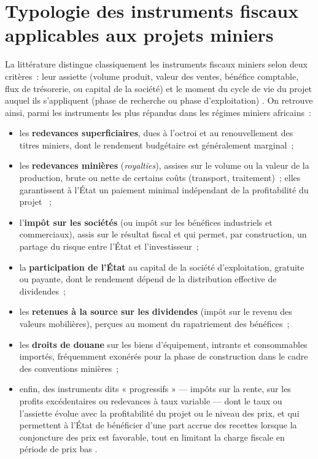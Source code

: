 \section{Typologie des instruments fiscaux applicables aux projets miniers}
\label{sec:typologie}

La littérature distingue classiquement les instruments fiscaux miniers selon deux critères~: leur assiette (volume produit, valeur des ventes, bénéfice comptable, flux de trésorerie, ou capital de la société) et le moment du cycle de vie du projet auquel ils s'appliquent (phase de recherche ou phase d'exploitation) \citep{otto2006royalties}. On retrouve ainsi, parmi les instruments les plus répandus dans les régimes miniers africains~:

\begin{itemize}
  \item les \textbf{redevances superficiaires}, dues à l'octroi et au renouvellement des titres miniers, dont le rendement budgétaire est généralement marginal~;
  \item les \textbf{redevances minières} (\emph{royalties}), assises sur le volume ou la valeur de la production, brute ou nette de certains coûts (transport, traitement)~; elles garantissent à l'État un paiement minimal indépendant de la profitabilité du projet \citep{guj2012royalties}~;
  \item l'\textbf{impôt sur les sociétés} (ou impôt sur les bénéfices industriels et commerciaux), assis sur le résultat fiscal et qui permet, par construction, un partage du risque entre l'État et l'investisseur~;
  \item la \textbf{participation de l'État} au capital de la société d'exploitation, gratuite ou payante, dont le rendement dépend de la distribution effective de dividendes~;
  \item les \textbf{retenues à la source sur les dividendes} (impôt sur le revenu des valeurs mobilières), perçues au moment du rapatriement des bénéfices~;
  \item les \textbf{droits de douane} sur les biens d'équipement, intrants et consommables importés, fréquemment exonérés pour la phase de construction dans le cadre des conventions minières~;
  \item enfin, des instruments dits « progressifs » --- impôts sur la rente, sur les profits excédentaires ou redevances à taux variable --- dont le taux ou l'assiette évolue avec la profitabilité du projet ou le niveau des prix, et qui permettent à l'État de bénéficier d'une part accrue des recettes lorsque la conjoncture des prix est favorable, tout en limitant la charge fiscale en période de prix bas \citep{rota-graziosi2015mali}.
\end{itemize}

